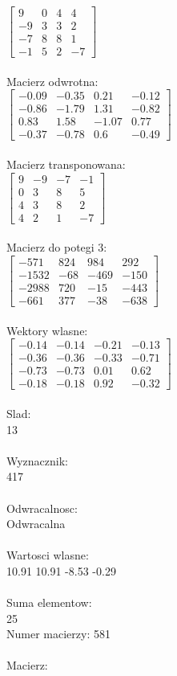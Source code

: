 \documentclass[a4paper,12pt]{article}
\begin{document}
$\begin{bmatrix} 9&0&4&4\\-9&3&3&2\\-7&8&8&1\\-1&5&2&-7 \end{bmatrix}$
\\
\\
Macierz odwrotna:\\

$\begin{bmatrix} -0.09&-0.35&0.21&-0.12\\-0.86&-1.79&1.31&-0.82\\0.83&1.58&-1.07&0.77\\-0.37&-0.78&0.6&-0.49 \end{bmatrix}$
\\
\\
Macierz transponowana:\\

$\begin{bmatrix} 9&-9&-7&-1\\0&3&8&5\\4&3&8&2\\4&2&1&-7 \end{bmatrix}$
\\
\\
Macierz do potegi 3:\\

$\begin{bmatrix} -571&824&984&292\\-1532&-68&-469&-150\\-2988&720&-15&-443\\-661&377&-38&-638 \end{bmatrix}$
\\
\\
Wektory wlasne:\\

$\begin{bmatrix} -0.14&-0.14&-0.21&-0.13\\-0.36&-0.36&-0.33&-0.71\\-0.73&-0.73&0.01&0.62\\-0.18&-0.18&0.92&-0.32 \end{bmatrix}$
\\
\\
Slad:\\
13
\\
\\
Wyznacznik:\\
417
\\
\\
Odwracalnosc:\\
Odwracalna
\\
\\
Wartosci wlasne:\\
10.91 10.91 -8.53 -0.29
\\
\\
Suma elementow:\\
25
\\
\newpage
Numer macierzy:
581
\\
\\
Macierz:\\
\end{document}
